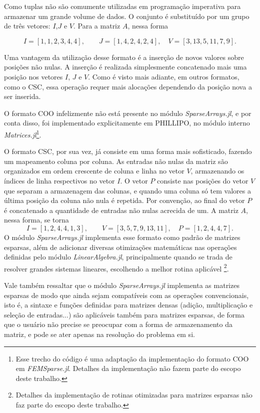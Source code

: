 Como tuplas não são comumente utilizadas em programação imperativa para armazenar um grande volume de dados. O conjunto é substituído por um grupo de três vetores: $I$,$J$ e $V$. Para a matriz $A$, nessa forma


\begin{equation}
    I =  [1, 1, 2, 3, 4, 4], \qquad J = [1, 4, 2, 4, 2, 4], \quad V = [3, 13, 5, 11, 7, 9].
    \label{eq:coo_2}
\end{equation}

Uma vantagem da utilização desse formato é a inserção de novos valores sobre posições não nulas. A inserção é realizada simplesmente concatenado mais uma posição nos vetores $I$, $J$ e $V$. Como é visto mais adiante, em outros formatos, como o CSC, essa operação requer mais alocações dependendo da posição nova a ser inserida.

O formato COO infelizmente não está presente no módulo \emph{SparseArrays.jl}, e por conta disso, foi implementado explicitamente em PHILLIPO, no módulo interno \emph{Matrices.jl}\footnote{Esse trecho do código é uma adaptação da implementação do formato COO em \emph{FEMSparse.jl}. Detalhes da implementação não fazem parte do escopo deste trabalho.}.

O formato CSC, por sua vez, já consiste em uma forma mais sofisticado, fazendo um mapeamento coluna por coluna. As entradas não nulas da matriz são organizados em ordem crescente de coluna e linha no vetor $V$, armazenando os índices de linha respectivos no vetor $I$. O vetor $P$ consiste nas posições do vetor $V$ que separam a armazenagem das colunas, e quando uma coluna só tem valores a última posição da coluna não nula é repetida. Por convenção, ao final do vetor $P$ é concatenado a quantidade de entradas não nulas acrecida de um. A matriz $A$, nessa forma, se torna
\begin{equation}
    I = [1, 2, 4, 4, 1, 3], \qquad V = [3, 5, 7, 9, 13, 11], \quad P = [1,2,4,4,7].
    \label{eq:coo_3}
\end{equation}
O módulo \emph{SparseArrays.jl} implementa esse formato como padrão de matrizes esparsas, além de adicionar diversas otimizações matemáticas nas operações definidas pelo módulo \emph{LinearAlgebra.jl}, principalmente quando se trada de resolver grandes sistemas lineares, escolhendo a melhor rotina aplicável \footnote{Detalhes da implementação de rotinas otimizadas para matrizes esparsas não faz parte do escopo deste trabalho.}.

Vale também ressaltar que o módulo \emph{SparseArrays.jl} implementa as matrizes esparsas de modo que ainda sejam compatíveis com as operações convencionais, isto é, a sintaxe e funções definidas para matrizes densas (adição, multiplicação e seleção de entradas...) são aplicáveis também para matrizes esparsas, de forma que o usuário não precise se preocupar com a forma de armazenamento da matriz, e pode se ater apenas na resolução do problema em si.

